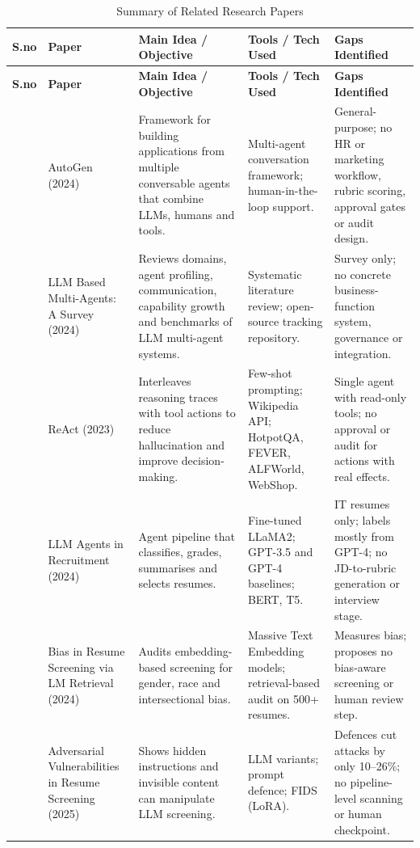 \clearpage
{\footnotesize
\renewcommand{\arraystretch}{1.35}
\begin{longtable}{|>{\raggedright\arraybackslash}p{0.75cm}|>{\raggedright\arraybackslash}p{2.6cm}|>{\raggedright\arraybackslash}p{3.75cm}|>{\raggedright\arraybackslash}p{3.0cm}|>{\raggedright\arraybackslash}p{3.4cm}|}
\caption{Summary of Related Research Papers}\label{tab:lit}\\
\hline
\textbf{S.no} & \textbf{Paper} & \textbf{Main Idea / Objective} & \textbf{Tools / Tech Used} & \textbf{Gaps Identified}\\ \hline
\endfirsthead
\hline
\textbf{S.no} & \textbf{Paper} & \textbf{Main Idea / Objective} & \textbf{Tools / Tech Used} & \textbf{Gaps Identified}\\ \hline
\endhead
\endlastfoot
1 & AutoGen (2024) & Framework for building applications from multiple conversable agents that combine LLMs, humans and tools. & Multi-agent conversation framework; human-in-the-loop support. & General-purpose; no HR or marketing workflow, rubric scoring, approval gates or audit design.\\ \hline
2 & LLM Based Multi-Agents: A Survey (2024) & Reviews domains, agent profiling, communication, capability growth and benchmarks of LLM multi-agent systems. & Systematic literature review; open-source tracking repository. & Survey only; no concrete business-function system, governance or integration.\\ \hline
3 & ReAct (2023) & Interleaves reasoning traces with tool actions to reduce hallucination and improve decision-making. & Few-shot prompting; Wikipedia API; HotpotQA, FEVER, ALFWorld, WebShop. & Single agent with read-only tools; no approval or audit for actions with real effects.\\ \hline
4 & LLM Agents in Recruitment (2024) & Agent pipeline that classifies, grades, summarises and selects resumes. & Fine-tuned LLaMA2; GPT-3.5 and GPT-4 baselines; BERT, T5. & IT resumes only; labels mostly from GPT-4; no JD-to-rubric generation or interview stage.\\ \hline
5 & Bias in Resume Screening via LM Retrieval (2024) & Audits embedding-based screening for gender, race and intersectional bias. & Massive Text Embedding models; retrieval-based audit on 500+ resumes. & Measures bias; proposes no bias-aware screening or human review step.\\ \hline
6 & Adversarial Vulnerabilities in Resume Screening (2025) & Shows hidden instructions and invisible content can manipulate LLM screening. & 12 LLM variants; prompt defence; FIDS (LoRA). & Defences cut attacks by only 10--26\%; no pipeline-level scanning or human checkpoint.\\ \hline

\end{longtable}}
